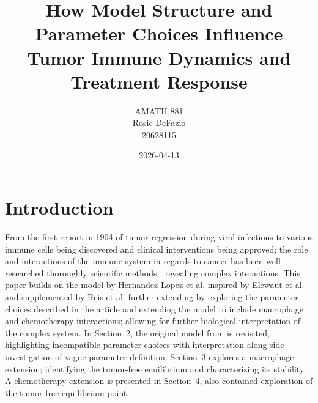 \documentclass[11pt]{article}
\title{How Model Structure and Parameter Choices Influence Tumor Immune Dynamics and Treatment Response}
\author{AMATH 881 \\Rosie DeFazio\\ 20628115}
\date{2026-04-13}
\theoremstyle{definition}
\begin{document}
\maketitle


\section{Introduction}
From the first report in 1904 of tumor regression during viral infections to various immune cells being discovered and clinical interventions being approved; the role and interactions of the immune system in regards to cancer 
has been well researched thoroughly scientific methods \parencite{aacr2025history}, revealing complex interactions. This paper builds on the model by Hernandez-Lopez et al. \parencite{ERX2026} inspired by Elewaut et al. \parencite{ERX2026} and supplemented by Reis et al. \parencite{reis2021bringing} further extending by exploring the parameter choices described in the article and extending 
the model to include macrophage and chemotherapy interactions; allowing for further biological interpretation of the complex system. In Section~2, the original model from \parencite{ERX2026} is revisited, highlighting incompatible parameter choices with
interpretation along side investigation of vague parameter definition. Section~3 explores a macrophage extension; identifying the tumor-free equilibrium and characterizing its stability.
A chemotherapy extension is presented in Section~4, also contained exploration of the tumor-free equilibrium point. 
\end{document}
